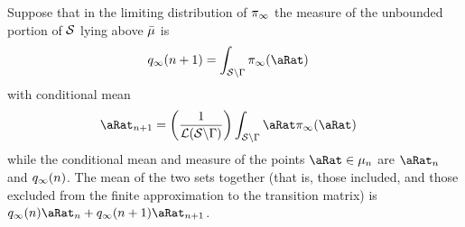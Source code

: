 \documentclass[\econtexRoot/BufferStockTheory.tex]{subfiles}
\begin{document}
Suppose that in the limiting distribution of $\pi_{\infty}$ the measure of the unbounded portion of $\mathcal{S}$ lying above $\bar{\mu}$ is
\begin{align}
  \pmfBinNow_{\infty}({\NumAprxStes+1}) & =\int_{\SetFullCnts \backslash \KrnPntNxtFmPntNowSetSprtTrnc}\DnsPnt_{\infty}(\pnt)  
\end{align}
with conditional mean
\begin{align}
  \pnterp_{\NumAprxStes+1} & = \left(\frac{1}{\Lebes(\SetFullCnts \backslash \KrnPntNxtFmPntNowSetSprtTrnc)}\right)\int_{\SetFullCnts \backslash \KrnPntNxtFmPntNowSetSprtTrnc}\pnt \DnsPnt_{\infty}(\pnt)  
\end{align}
while the conditional mean and measure of the points $\pnt \in \SetPartCnts_{\NumAprxStes}$ are $\pnterp_{\NumAprxStes}$ and $q_{\infty}(n)$.  The mean of the two sets together (that is, those included, and those excluded from the finite approximation to the transition matrix) is $\pmfBinNow_{\infty}(\NumAprxStes)\pnterp_{\NumAprxStes}+\pmfBinNow_{\infty}(\NumAprxStes+1)\pnterp_{\NumAprxStes+1}$.
\begin{comment}
We add to the probability mass of the last point the probability mass in the unbounded region above $\Top{\SetPartCnts}_{\NumAprxStes}$:
\begin{align}
  \hat{\pmfBinNow}_{\infty}(\NumAprxStes) & = \pmfBinNow_{\infty}(\NumAprxStes)+\pmfBinNow_{\infty}(\NumAprxStes+1)
\end{align}
and the adjusted location of the last point mass is implicitly given by 
\begin{align}
  \hat{\pmfBinNow}_{\infty}(\NumAprxStes)\hat{\pnterp}_{\NumAprxStes}    & = \pmfBinNow_{\infty}(\NumAprxStes)\pnterp_{\NumAprxStes}+\pmfBinNow_{\infty}(\NumAprxStes+1)\pnterp_{\NumAprxStes+1}
  \\    \hat{\pnterp}_{\NumAprxStes}    & = \left(\frac{\pmfBinNow_{\infty}(\NumAprxStes)\pnterp_{\NumAprxStes}+\pmfBinNow_{\infty}(\NumAprxStes+1)\pnterp_{\NumAprxStes+1}}{\hat{\pmfBinNow}_{\infty}(\NumAprxStes)}\right)
\end{align}
\end{comment} %
\begin{comment}
  This can be done in a mean preserving way easily: Multiply the value of the last mass point in the Markov matrix by:
  \begin{align}
    & = \left(\frac{(\int_{\SetFullCnts \backslash \KrnPntNxtFmPntNowSetSprtTrnc} \pnt \DnsPnt(\pnt))+(\int_{\Bot{\NumAprxStes}}^{\Top{\NumAprxStes}} \pnt \DnsPnt(\pnt))}{(\int_{\Bot{\NumAprxStes}}^{\Top{\NumAprxStes}} \pnt \DnsPnt(\pnt))}\right)
  \end{align}
\end{comment}
\end{document}
